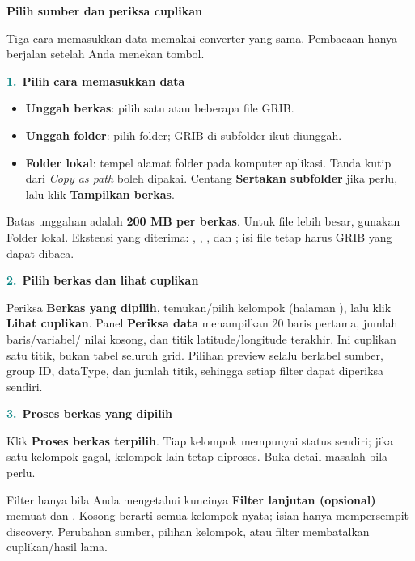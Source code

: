 \documentclass[11pt,a4paper]{article}
\newcommand{\step}[2]{\par\addvspace{2mm}\noindent\textcolor{teal}{\textbf{#1.}}\ \textbf{#2}\par\nobreak}
\newcommand{\pagetitle}[3]{\clearpage{\color{teal}\small\bfseries LANGKAH #1}\par{\color{slate}\LARGE\bfseries #2}\par\vspace{2mm}#3\par\vspace{3mm}}
\begin{document}
\pagetitle{10}{Pilih sumber dan periksa cuplikan}{Tiga cara memasukkan data memakai converter yang sama. Pembacaan hanya berjalan setelah Anda menekan tombol.}
\label{pg:web-input}
\par\noindent{}\par
\step{1}{Pilih cara memasukkan data}
\begin{itemize}[itemsep=2pt]
\item \textbf{Unggah berkas}: pilih satu atau beberapa file GRIB.
\item \textbf{Unggah folder}: pilih folder; GRIB di subfolder ikut diunggah.
\item \textbf{Folder lokal}: tempel alamat folder pada komputer aplikasi.
      Tanda kutip dari \emph{Copy as path} boleh dipakai. Centang
      \textbf{Sertakan subfolder} jika perlu, lalu klik \textbf{Tampilkan berkas}.
\end{itemize}
Batas unggahan adalah \textbf{200 MB per berkas}. Untuk file lebih besar,
gunakan Folder lokal. Ekstensi yang diterima: , ,
, dan ; isi file tetap harus GRIB yang dapat dibaca.
\step{2}{Pilih berkas dan lihat cuplikan}
Periksa \textbf{Berkas yang dipilih}, temukan/pilih kelompok (halaman
\pageref{pg:web-groups}), lalu klik \textbf{Lihat cuplikan}.
Panel \textbf{Periksa data} menampilkan 20 baris pertama, jumlah baris/variabel/
nilai kosong, dan titik latitude/longitude terakhir. Ini cuplikan satu titik,
bukan tabel seluruh grid. Pilihan preview selalu berlabel sumber, group ID,
dataType, dan jumlah titik, sehingga setiap filter dapat diperiksa sendiri.
\step{3}{Proses berkas yang dipilih}
Klik \textbf{Proses berkas terpilih}. Tiap kelompok mempunyai status sendiri;
jika satu kelompok gagal, kelompok lain tetap diproses. Buka detail masalah bila perlu.
\begin{panel}{Filter hanya bila Anda mengetahui kuncinya}
\textbf{Filter lanjutan (opsional)} memuat  dan
. Kosong berarti semua kelompok nyata; isian hanya
mempersempit discovery. Perubahan sumber, pilihan kelompok, atau filter
membatalkan cuplikan/hasil lama.
\end{panel}
\end{document}
